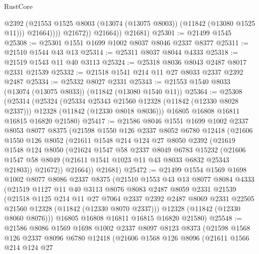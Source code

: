\begin{lexlean}{RustCore}
\begin{coremodule}
                      @2392
                      (@21553 @1525 @8003 (@13074 (@13075 @8003)) (@11842 (@13080 @1525 @11)))
                      @21664))))
              @21672))
          @21664))
      @21681)
@25301 := @21499 @1545
@25308 := @25301 @1551 @1699 @1002 @8037 @8046 @2337 @8377
@25311 := @21510 @1544 @43 @13
@25314 := @25311 @8037 @8044 @4333
@25318 := @21519 @1543 @11 @40 @3113
@25324 := @25318 @8036 @8043 @2487 @8017 @2331 @21539
@25332 := @21518 @1541 @214 @11 @27 @8033 @2337 @2392 @2487
@25334 := @25332 @8027 @2331
@25343 := @21553 @1540 @8033 (@13074 (@13075 @8033)) (@11842 (@13080 @1540 @11))
@25364 := @25308
    (@25314
      (@25324
        (@25334 @25343 @21560 @12328 (@11842 (@12330 @8028 @2337)))
        @12328
        (@11842 (@12330 @8018 @8036)))
      @16805
      @16808
      @16811
      @16815
      @16820
      @21580)
@25417 := @21586
    @8046
    @1551
    @1699
    @1002
    @2337
    @8053
    @8077
    @8375
    (@21598
      @1550
      @126
      @2337
      @8052
      @6780
      @12418
      (@21606
        @1550
        @126
        @8052
        (@21611
          @1548
          @214
          @124
          @27
          @8050
          @2392
          (@21619
            @1548
            @124
            @8050
            (@21624
              @1547
              @58
              @2337
              @8049
              @6783
              @15232
              (@21606 @1547 @58 @8049 (@21611 @1541 @1023 @11 @43 @8033 @6832 @25343 @21803))
              @21672))
          @21664))
      @21681)
@25472 := @21499
    @1554
    @1569
    @1698
    @1002
    @8077
    @8086
    @2337
    @8375
    (@21510
      @1553
      @43
      @13
      @8077
      @8084
      @4333
      (@21519
        @1127
        @11
        @40
        @3113
        @8076
        @8083
        @2487
        @8059
        @2331
        @21539
        (@21518
          @1125
          @214
          @11
          @27
          @7064
          @2337
          @2392
          @2487
          @8069
          @2331
          @22505
          @21560
          @12328
          (@11842 (@12330 @8070 @2337)))
        @12328
        (@11842 (@12330 @8060 @8076)))
      @16805
      @16808
      @16811
      @16815
      @16820
      @21580)
@25548 := @21586
    @8086
    @1569
    @1698
    @1002
    @2337
    @8097
    @8123
    @8373
    (@21598
      @1568
      @126
      @2337
      @8096
      @6780
      @12418
      (@21606
        @1568
        @126
        @8096
        (@21611
          @1566
          @214
          @124
          @27

\end{coremodule}
\end{lexlean}
